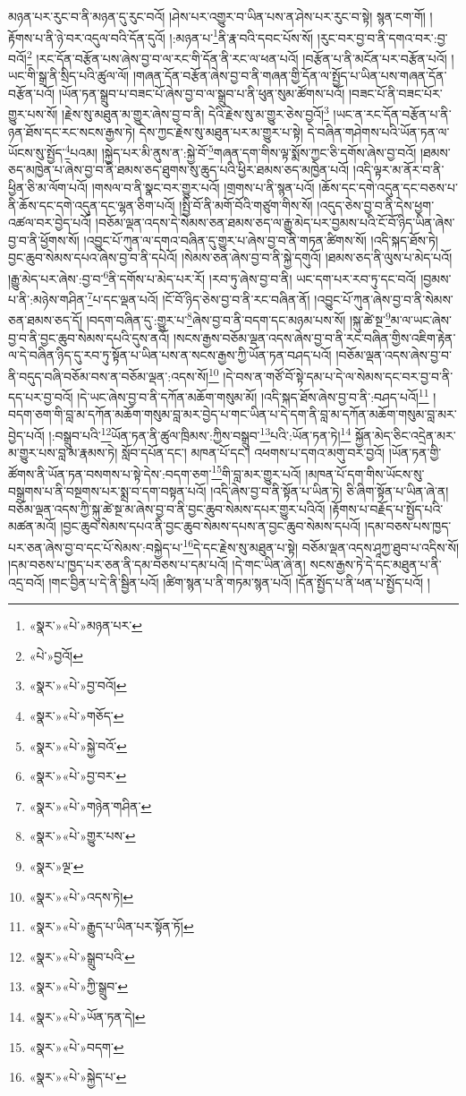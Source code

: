 མཉན་པར་རུང་བ་ནི་མཉན་དུ་རུང་བའོ། །ཤེས་པར་འགྱུར་བ་ཡིན་པས་ན་ཤེས་པར་རུང་བ་སྟེ། སྙན་ངག་གོ། །རྟོགས་པ་ནི་ཉེ་བར་འདུལ་བའི་དོན་དུའོ། །:མཉན་པ་\footnote{«སྣར་»«པེ་»མཉན་པར་}ནི་རྣ་བའི་དབང་པོས་སོ། །རུང་བར་བྱ་བ་ནི་དགའ་བར་:བྱ་བའོ།\footnote{«པེ་»བྱའོ།} །རང་དོན་བརྩོན་པས་ཞེས་བྱ་བ་ལ་རང་གི་དོན་ནི་རང་ལ་ཕན་པའོ། །བརྩོན་པ་ནི་མངོན་པར་བརྩོན་པའོ། །ཡང་གི་སྒྲ་ནི་སྲིད་པའི་ཚུལ་ལོ། །གཞན་དོན་བརྩོན་ཞེས་བྱ་བ་ནི་གཞན་གྱི་དོན་ལ་སྤྱོད་པ་ཡིན་པས་གཞན་དོན་བརྩོན་པའོ། །ཡོན་ཏན་སྒྲུབ་པ་བཟང་པོ་ཞེས་བྱ་བ་ལ་སྒྲུབ་པ་ནི་ཕུན་སུམ་ཚོགས་པའོ། །བཟང་པོ་ནི་བཟང་པོར་གྱུར་པས་སོ། །རྗེས་སུ་མཐུན་མ་གྱུར་ཞེས་བྱ་བ་ནི། དེའི་རྗེས་སུ་མ་གྱུར་ཅེས་བྱའོ།\footnote{«སྣར་»«པེ་»བྱ་བའོ།} །ཡང་ན་རང་དོན་བརྩོན་པ་ནི་ཉན་ཐོས་དང་རང་སངས་རྒྱས་ཏེ། དེས་ཀྱང་རྗེས་སུ་མཐུན་པར་མ་གྱུར་པ་སྟེ། དེ་བཞིན་གཤེགས་པའི་ཡོན་ཏན་ལ་ཡོངས་སུ་སྤྱོད་\footnote{«སྣར་»«པེ་»གཅོད་}པའམ། །སྐྱེད་པར་མི་ནུས་ན་:སྐྱེ་བོ་\footnote{«སྣར་»«པེ་»སྐྱེ་བའོ་}གཞན་དག་གིས་ལྟ་སྨོས་ཀྱང་ཅི་དགོས་ཞེས་བྱ་བའོ། །ཐམས་ཅད་མཁྱེན་པ་ཞེས་བྱ་བ་ནི་ཐམས་ཅད་ཐུགས་སུ་ཆུད་པའི་ཕྱིར་ཐམས་ཅད་མཁྱེན་པའོ། །འདི་ལྟར་མ་ནོར་བ་ནི་ཕྱིན་ཅི་མ་ལོག་པའོ། །གསལ་བ་ནི་སྣང་བར་གྱུར་པའོ། །གྲགས་པ་ནི་སྙན་པའོ། །ཆོས་དང་དགེ་འདུན་དང་བཅས་པ་ནི་ཆོས་དང་དགེ་འདུན་དང་ལྷན་ཅིག་པའོ། །སྤྱི་བོ་ནི་མགོ་བོའི་གཙུག་གིས་སོ། །འདུད་ཅེས་བྱ་བ་ནི་དེས་ཕྱག་འཚལ་བར་བྱེད་པའོ། །བཅོམ་ལྡན་འདས་དེ་སེམས་ཅན་ཐམས་ཅད་ལ་རྒྱུ་མེད་པར་བྱམས་པའི་ངོ་བོ་ཉིད་ཡིན་ཞེས་བྱ་བ་ནི་ཕྱོགས་སོ། །འབྱུང་པོ་ཀུན་ལ་དགའ་བཞིན་དུ་གྱུར་པ་ཞེས་བྱ་བ་ནི་གཏན་ཚིགས་སོ། །འདི་སྐད་ཐོས་ཏེ། བྱང་ཆུབ་སེམས་དཔའ་ཞེས་བྱ་བ་ནི་དཔེའོ། །སེམས་ཅན་ཞེས་བྱ་བ་ནི་སྐྱེ་དགུའོ། །ཐམས་ཅད་ནི་ལུས་པ་མེད་པའོ། །རྒྱུ་མེད་པར་ཞེས་:བྱ་བ་\footnote{«སྣར་»«པེ་»བྱ་བར་}ནི་དགོས་པ་མེད་པར་རོ། །རབ་ཏུ་ཞེས་བྱ་བ་ནི། ཡང་དག་པར་རབ་ཏུ་དང་བའོ། །བྱམས་པ་ནི་:མཉེས་གཤིན་\footnote{«སྣར་»«པེ་»གཉེན་གཤིན་}པ་དང་ལྡན་པའོ། །ངོ་བོ་ཉིད་ཅེས་བྱ་བ་ནི་རང་བཞིན་ནོ། །འབྱུང་པོ་ཀུན་ཞེས་བྱ་བ་ནི་སེམས་ཅན་ཐམས་ཅད་དོ། །བདག་བཞིན་དུ་:གྱུར་པ་\footnote{«སྣར་»«པེ་»གྱུར་པས་}ཞེས་བྱ་བ་ནི་བདག་དང་མཉམ་པས་སོ། །སྐུ་ཚེ་སྔ་\footnote{«སྣར་»ལྔ་}མ་ལ་ཡང་ཞེས་བྱ་བ་ནི་བྱང་ཆུབ་སེམས་དཔའི་དུས་ནའོ། །སངས་རྒྱས་བཅོམ་ལྡན་འདས་ཞེས་བྱ་བ་ནི་རང་བཞིན་གྱིས་འཇིག་རྟེན་ལ་དེ་བཞིན་ཉིད་དུ་རབ་ཏུ་སྟོན་པ་ཡིན་པས་ན་སངས་རྒྱས་ཀྱི་ཡོན་ཏན་བཤད་པའོ། །བཅོམ་ལྡན་འདས་ཞེས་བྱ་བ་ནི་བདུད་བཞི་བཅོམ་བས་ན་བཅོམ་ལྡན་:འདས་སོ།\footnote{«སྣར་»«པེ་»འདས་ཏེ།} །དེ་བས་ན་གཙོ་བོ་སྟེ་དམ་པ་དེ་ལ་སེམས་དང་བར་བྱ་བ་ནི་དད་པར་བྱ་བའོ། །དེ་ཡང་ཞེས་བྱ་བ་ནི་དཀོན་མཆོག་གསུམ་མོ། །འདི་སྐད་ཐོས་ཞེས་བྱ་བ་ནི་:བཤད་པའོ།\footnote{«སྣར་»«པེ་»རྒྱུད་པ་ཡིན་པར་སྟོན་ཏོ།} །བདག་ཅག་གི་བླ་མ་དཀོན་མཆོག་གསུམ་བླ་མར་བྱེད་པ་གང་ཡིན་པ་དེ་དག་ནི་བླ་མ་དཀོན་མཆོག་གསུམ་བླ་མར་བྱེད་པའོ། །:བསྒྲུབ་པའི་\footnote{«སྣར་»«པེ་»སྒྲུབ་པའི་}ཡོན་ཏན་ནི་ཚུལ་ཁྲིམས་:ཀྱིས་བསྒྲུབ་\footnote{«སྣར་»«པེ་»ཀྱི་སྒྲུབ་}པའི་:ཡོན་ཏན་ཏེ།\footnote{«སྣར་»«པེ་»ཡོན་ཏན་དེ།} སྐྱོན་མེད་ཅིང་འདྲེན་མར་མ་གྱུར་པས་བླ་མ་རྣམས་ཏེ། སློབ་དཔོན་དང་། མཁན་པོ་དང་། འཕགས་པ་དགའ་མགུ་བར་བྱའོ། །ཡོན་ཏན་གྱི་ཚོགས་ནི་ཡོན་ཏན་བསགས་པ་སྟེ་དེས་:བདག་ཅག་\footnote{«སྣར་»«པེ་»བདག་}གི་བླ་མར་གྱུར་པའོ། །མཁན་པོ་དག་གིས་ཡོངས་སུ་བསྒྲགས་པ་ནི་བསྔགས་པར་སྨྲ་བ་དག་བསྟན་པའོ། །འདི་ཞེས་བྱ་བ་ནི་སྟོན་པ་ཡིན་ཏེ། ཅི་ཞིག་སྟོན་པ་ཡིན་ཞེ་ན། བཅོམ་ལྡན་འདས་ཀྱི་སྐུ་ཚེ་སྔ་མ་ཞེས་བྱ་བ་ནི་བྱང་ཆུབ་སེམས་དཔར་གྱུར་པའིའོ། །རྟོགས་པ་བརྗོད་པ་སྤྱོད་པའི་མཚན་མའོ། །བྱང་ཆུབ་སེམས་དཔའ་ནི་བྱང་ཆུབ་སེམས་དཔས་ན་བྱང་ཆུབ་སེམས་དཔའོ། །དམ་བཅས་པས་ཁྱད་པར་ཅན་ཞེས་བྱ་བ་དང་པོ་སེམས་:བསྐྱེད་པ་\footnote{«སྣར་»«པེ་»སྐྱེད་པ་}དེ་དང་རྗེས་སུ་མཐུན་པ་སྟེ། བཅོམ་ལྡན་འདས་ཤཱཀྱ་ཐུབ་པ་འདིས་སོ། །དམ་བཅས་པ་ཁྱད་པར་ཅན་ནི་དམ་བཅས་པ་དམ་པའོ། །དེ་གང་ཡིན་ཞེ་ན། སངས་རྒྱས་ཏེ་དེ་དང་མཐུན་པ་ནི་འདྲ་བའོ། །གང་བྱིན་པ་དེ་ནི་སྦྱིན་པའོ། །ཚིག་སྙན་པ་ནི་གཏམ་སྙན་པའོ། །དོན་སྤྱོད་པ་ནི་ཕན་པ་སྤྱོད་པའོ། །
